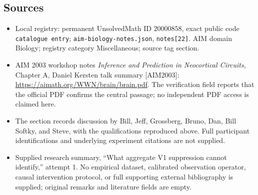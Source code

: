 \documentclass[11pt]{article}
\begin{document}
\subsection{Sources}
\begin{itemize}
\item Local registry: permanent UnsolvedMath ID \(20000858\), exact public code \texttt{catalogue entry}; \texttt{aim-biology-notes.json}, \texttt{notes[22]}. AIM domain Biology; registry category Miscellaneous; source tag section.
\item AIM 2003 workshop notes \emph{Inference and Prediction in Neocortical Circuits}, Chapter A, Daniel Kersten talk summary [AIM2003]: \url{https://aimath.org/WWN/brain/brain.pdf}. The verification field reports that the official PDF confirms the central passage; no independent PDF access is claimed here.
\item The section records discussion by Bill, Jeff, Grossberg, Bruno, Dan, Bill Softky, and Steve, with the qualifications reproduced above. Full participant identifications and underlying experiment citations are not supplied.
\item Supplied research summary, ``What aggregate V1 suppression cannot identify,'' attempt 1. No empirical dataset, calibrated observation operator, causal intervention protocol, or full supporting external bibliography is supplied; original remarks and literature fields are empty.
\end{itemize}
\end{document}
